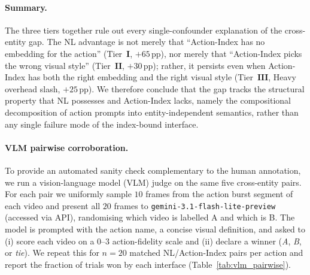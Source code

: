 \paragraph{Summary.}
The three tiers together rule out every single-confounder explanation of the cross-entity gap. The NL advantage is not merely that ``Action-Index has no embedding for the action'' (Tier~$\mathbf{I}$, $+65$\,pp), nor merely that ``Action-Index picks the wrong visual style'' (Tier~$\mathbf{II}$, $+30$\,pp); rather, it persists even when Action-Index has both the right embedding and the right visual style (Tier~$\mathbf{III}$, Heavy overhead slash, $+25$\,pp). We therefore conclude that the gap tracks the structural property that NL possesses and Action-Index lacks, namely the compositional decomposition of action prompts into entity-independent semantics, rather than any single failure mode of the index-bound interface.


\paragraph{VLM pairwise corroboration.}
To provide an automated sanity check complementary to the human annotation, we run a vision-language model (VLM) judge on the same five cross-entity pairs.
For each pair we uniformly sample $10$ frames from the action burst segment of each video and present all $20$ frames to \texttt{gemini-3.1-flash-lite-preview} (accessed via API), randomising which video is labelled A and which is B.
The model is prompted with the action name, a concise visual definition, and asked to (i) score each video on a $0$--$3$ action-fidelity scale and (ii) declare a winner (\textit{A}, \textit{B}, or \textit{tie}).
We repeat this for $n{=}20$ matched NL/Action-Index pairs per action and report the fraction of trials won by each interface (Table~\ref{tab:vlm_pairwise}).

